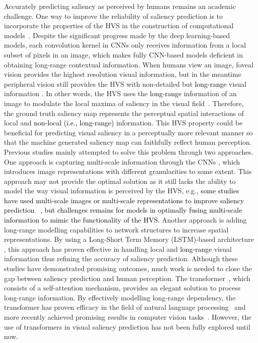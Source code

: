 \documentclass{article}
\begin{document}
Accurately predicting saliency as perceived by humans remains an academic challenge. One way to improve the reliability of saliency prediction is to incorporate the properties of the HVS in the construction of computational models~\cite{ITTI_2006, Toet_2011}. Despite the significant progress made by the deep learning-based models, each convolution kernel in CNNs only receives information from a local subset of pixels in an image, which makes fully CNN-based models deficient in obtaining long-range contextual information. When humans view an image, foveal vision provides the highest resolution visual information, but in the meantime peripheral vision still provides the HVS with non-detailed but \textcolor{black}{long-range} visual information \cite{peripheral_1,peripheral_2,longrange_vis}. In other words, the HVS uses the \textcolor{black}{long-range} information of an image to modulate the local maxima of saliency in the visual field~\cite{Toet_2011, ITTI20001489}. Therefore, the ground truth saliency map represents the perceptual spatial interactions of local and \textcolor{black}{non-local (i.e., long-range)} information. This HVS property could be beneficial for predicting visual saliency in a perceptually more relevant manner so that the machine generated saliency map can faithfully reflect human perception. Previous studies mainly attempted to solve this problem through two approaches. One approach is capturing multi-scale information through the CNNs \cite{Huang_2015, CASNET2, MSI-Net, GAZEGAN, DVA_Wang}, which introduces image representations with different granularities to some extent. This approach may not provide the optimal solution as it still lacks the ability to model the way visual information is perceived by the HVS, e.g.,
\textcolor{black}{some studies have used multi-scale images or multi-scale representations to improve saliency prediction ~\cite{Huang_2015, CASNET2, MSI-Net, GAZEGAN, DVA_Wang}, but challenges remains for models in optimally fusing multi-scale information to mimic the functionality of the HVS.}
Another approach is adding long-range modelling capabilities to network structures to increase spatial representations. By using a Long-Short Term Memory (LSTM)-based architecture \cite{SAM_Cornia, DSCLSTM}, this approach has proven effective in handling local and \textcolor{black}{long-range} visual information thus refining the accuracy of saliency prediction. Although these studies have demonstrated promising outcomes, much work is needed to close the gap between saliency prediction and human perception. The transformer~\cite{att_is_all}, which consists of a self-attention mechanism, provides an elegant solution to process long-range information. By effectively modelling long-range dependency, the transformer has proven efficacy in the field of natural language processing~\cite{BERT}
and more recently achieved promising results in computer vision tasks~\cite{ViT,iGPT}. However, the use of transformers in visual saliency prediction has not been fully explored until now.
\end{document}
